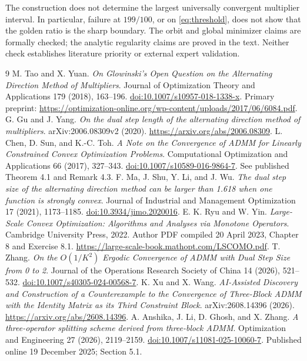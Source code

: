\documentclass[11pt,a4paper]{article}
\theoremstyle{remark}
\begin{document}
The construction does not determine the largest universally convergent
multiplier interval. In particular, failure at $199/100$, or on
\eqref{eq:threshold}, does not show that the golden ratio is the sharp
boundary. The orbit and global minimizer claims are formally checked;
the analytic regularity claims are proved in the text. Neither check
establishes literature priority or external expert validation.

{\small
\begin{thebibliography}{9}
\setlength{\itemsep}{1pt}
\setlength{\parskip}{0pt}
 M. Tao and X. Yuan. \emph{On Glowinski's Open Question on the Alternating Direction Method of Multipliers}. Journal of Optimization Theory and Applications 179 (2018), 163--196. \href{https://doi.org/10.1007/s10957-018-1338-x}{doi:10.1007/s10957-018-1338-x}. Primary preprint: \url{https://optimization-online.org/wp-content/uploads/2017/06/6084.pdf}.
 G. Gu and J. Yang. \emph{On the dual step length of the alternating direction method of multipliers}. arXiv:2006.08309v2 (2020). \url{https://arxiv.org/abs/2006.08309}.
 L. Chen, D. Sun, and K.-C. Toh. \emph{A Note on the Convergence of ADMM for Linearly Constrained Convex Optimization Problems}. Computational Optimization and Applications 66 (2017), 327--343. \href{https://doi.org/10.1007/s10589-016-9864-7}{doi:10.1007/s10589-016-9864-7}. See published Theorem 4.1 and Remark 4.3.
 F. Ma, J. Shu, Y. Li, and J. Wu. \emph{The dual step size of the alternating direction method can be larger than 1.618 when one function is strongly convex}. Journal of Industrial and Management Optimization 17 (2021), 1173--1185. \href{https://doi.org/10.3934/jimo.2020016}{doi:10.3934/jimo.2020016}.
 E. K. Ryu and W. Yin. \emph{Large-Scale Convex Optimization: Algorithms and Analyses via Monotone Operators}. Cambridge University Press, 2022. Author PDF compiled 20 April 2023, Chapter 8 and Exercise 8.1. \url{https://large-scale-book.mathopt.com/LSCOMO.pdf}.
 T. Zhang. \emph{On the $O(1/K^2)$ Ergodic Convergence of ADMM with Dual Step Size from 0 to 2}. Journal of the Operations Research Society of China 14 (2026), 521--532. \href{https://doi.org/10.1007/s40305-024-00568-7}{doi:10.1007/s40305-024-00568-7}.
 K. Xu and X. Wang. \emph{AI-Assisted Discovery and Construction of a Counterexample to the Convergence of Three-Block ADMM with the Identity Matrix as its Third Constraint Block}. arXiv:2608.14396 (2026). \url{https://arxiv.org/abs/2608.14396}.
 A. Anshika, J. Li, D. Ghosh, and X. Zhang. \emph{A three-operator splitting scheme derived from three-block ADMM}. Optimization and Engineering 27 (2026), 2119--2159. \href{https://doi.org/10.1007/s11081-025-10060-7}{doi:10.1007/s11081-025-10060-7}. Published online 19 December 2025; Section 5.1.

\end{thebibliography}}
\end{document}
